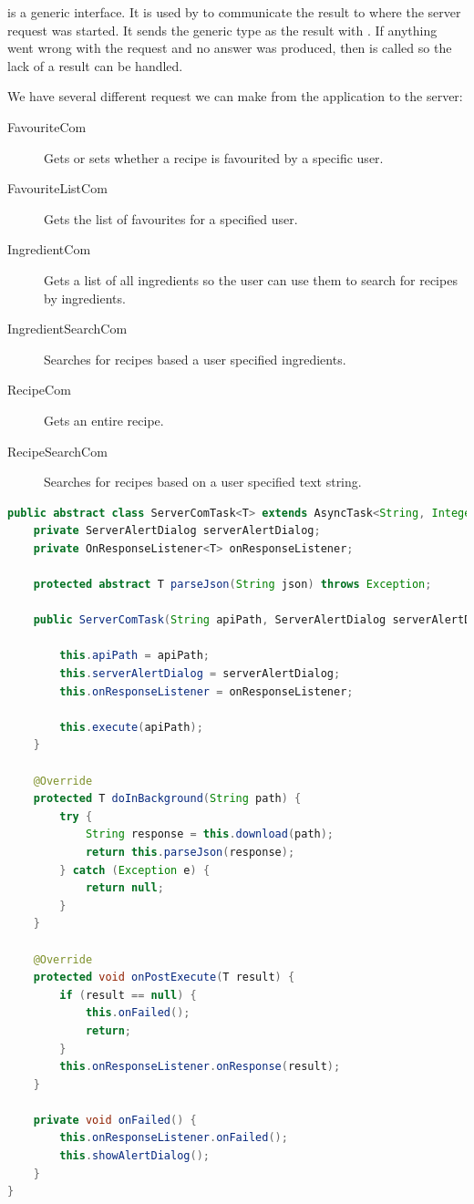  is a generic interface. It is used by  to communicate the result to where the server request was started. It sends the generic type as the result with . If anything went wrong with the request and no answer was produced, then  is called so the lack of a result can be handled.

We have several different request we can make from the application to the server:
\begin{description}
\item[FavouriteCom] Gets or sets whether a recipe is favourited by a specific user.
\item[FavouriteListCom] Gets the list of favourites for a specified user.
\item[IngredientCom] Gets a list of all ingredients so the user can use them to search for recipes by ingredients.
\item[IngredientSearchCom] Searches for recipes based a user specified ingredients.
\item[RecipeCom] Gets an entire recipe.
\item[RecipeSearchCom] Searches for recipes based on a user specified text string.
\end{description}

\begin{lstlisting}[language=java, label=lst:servercomtask, caption={Simplified code of the \inline{ServerComTask}}]
public abstract class ServerComTask<T> extends AsyncTask<String, Integer, T> {
    private ServerAlertDialog serverAlertDialog;
    private OnResponseListener<T> onResponseListener;

    protected abstract T parseJson(String json) throws Exception;
    
    public ServerComTask(String apiPath, ServerAlertDialog serverAlertDialog, OnResponseListener<T> onResponseListener) {
    
        this.apiPath = apiPath;
        this.serverAlertDialog = serverAlertDialog;
        this.onResponseListener = onResponseListener;

        this.execute(apiPath);
    }

    @Override
    protected T doInBackground(String path) {
        try {
            String response = this.download(path);
            return this.parseJson(response);
        } catch (Exception e) {
            return null;
        }
    }

    @Override
    protected void onPostExecute(T result) {
        if (result == null) {
            this.onFailed();
            return;
        }
        this.onResponseListener.onResponse(result);
    }
    
    private void onFailed() {
        this.onResponseListener.onFailed();
        this.showAlertDialog();
    }
}
\end{lstlisting}

